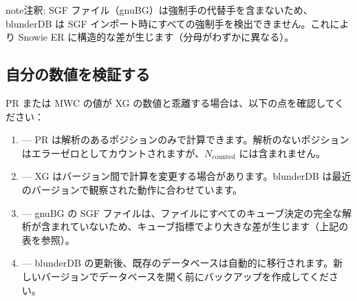 \documentclass[letterpaper,10pt,dvipdfmx]{sphinxmanual}
\begin{document}
\begin{sphinxadmonition}{note}{注釈:}
\sphinxAtStartPar
SGF ファイル（gnuBG）は強制手の代替手を含まないため、blunderDB は SGF インポート時にすべての強制手を検出できません。これにより Snowie ER に構造的な差が生じます（分母がわずかに異なる）。
\end{sphinxadmonition}


\subsection{自分の数値を検証する}
\label{\detokenize{stats_parity:valider-vos-propres-chiffres}}
\sphinxAtStartPar
PR または MWC の値が XG の数値と乖離する場合は、以下の点を確認してください：
\begin{enumerate}
%
\item {} 
\sphinxAtStartPar
{} — PR は解析のあるポジションのみで計算できます。解析のないポジションはエラーゼロとしてカウントされますが、\(N_\text{counted}\) には含まれません。

\item {} 
\sphinxAtStartPar
{} — XG はバージョン間で計算を変更する場合があります。blunderDB は最近のバージョンで観察された動作に合わせています。

\item {} 
\sphinxAtStartPar
{} — gnuBG の SGF ファイルは、ファイルにすべてのキューブ決定の完全な解析が含まれていないため、キューブ指標でより大きな差が生じます（上記の表を参照）。

\item {} 
\sphinxAtStartPar
{} — blunderDB の更新後、既存のデータベースは自動的に移行されます。新しいバージョンでデータベースを開く前にバックアップを作成してください。

\end{enumerate}
\end{document}
